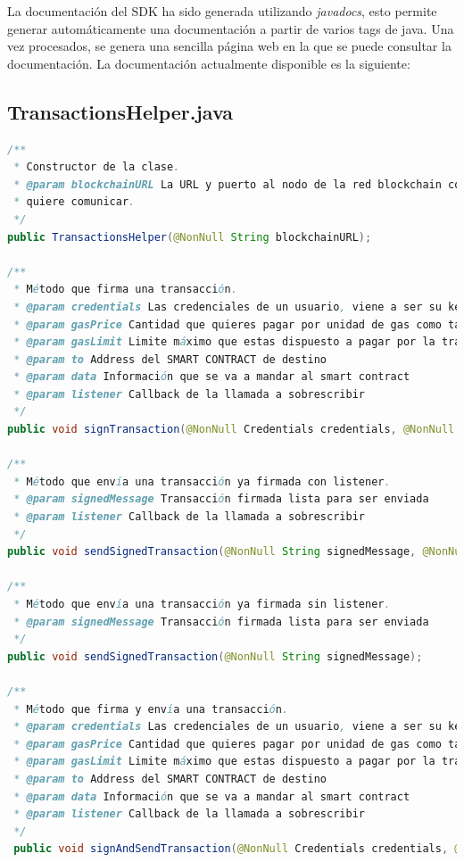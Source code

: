 La documentación del SDK ha sido generada utilizando \emph{javadocs}, esto permite generar automáticamente una documentación a partir de varios tags de java. Una vez procesados, se genera una sencilla página web en la que se puede consultar la documentación. La documentación actualmente disponible es la siguiente: 

\subsection{TransactionsHelper.java}
\begin{lstlisting}[language=Java,caption={[Java] Documentación de TransactionsHelper},label=lst:transactionHelper]
/**
 * Constructor de la clase.
 * @param blockchainURL La URL y puerto al nodo de la red blockchain con la que se
 * quiere comunicar. 
 */
public TransactionsHelper(@NonNull String blockchainURL);

/**
 * Método que firma una transacción.
 * @param credentials Las credenciales de un usuario, viene a ser su keystore
 * @param gasPrice Cantidad que quieres pagar por unidad de gas como tarifa al minero
 * @param gasLimit Limite máximo que estas dispuesto a pagar por la transacción
 * @param to Address del SMART CONTRACT de destino
 * @param data Información que se va a mandar al smart contract
 * @param listener Callback de la llamada a sobrescribir
 */
public void signTransaction(@NonNull Credentials credentials, @NonNull String gasPrice, @NonNull String gasLimit, @NonNull String to, @NonNull String data, @NonNull EasyBlockchainListener listener);

/**
 * Método que envía una transacción ya firmada con listener.
 * @param signedMessage Transacción firmada lista para ser enviada
 * @param listener Callback de la llamada a sobrescribir
 */
public void sendSignedTransaction(@NonNull String signedMessage, @NonNull EasyBlockchainListener listener);

/**
 * Método que envía una transacción ya firmada sin listener.
 * @param signedMessage Transacción firmada lista para ser enviada
 */
public void sendSignedTransaction(@NonNull String signedMessage);

/**
 * Método que firma y envía una transacción.
 * @param credentials Las credenciales de un usuario, viene a ser su keystore
 * @param gasPrice Cantidad que quieres pagar por unidad de gas como tarifa al minero
 * @param gasLimit Limite máximo que estas dispuesto a pagar por la transacción
 * @param to Address del SMART CONTRACT de destino
 * @param data Información que se va a mandar al smart contract
 * @param listener Callback de la llamada a sobrescribir
 */  
 public void signAndSendTransaction(@NonNull Credentials credentials, @NonNull String gasPrice, @NonNull String gasLimit, @NonNull String to, @NonNull String data);
\end{lstlisting}

